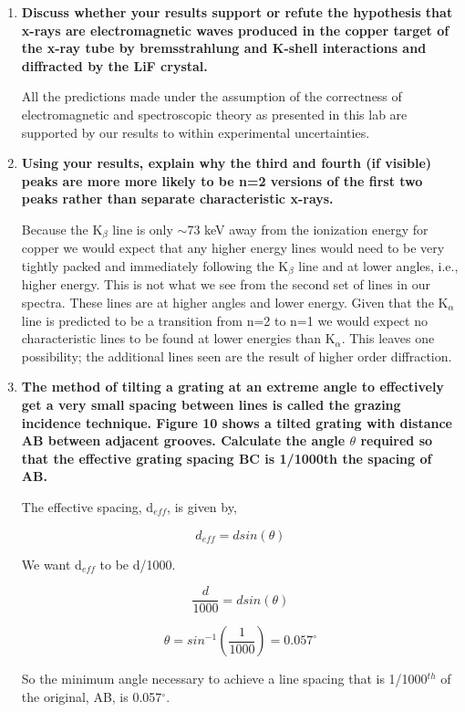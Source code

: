 \begin{enumerate}[resume]
\item {\bf Discuss whether your results support or refute the hypothesis that x-rays are electromagnetic waves produced in the copper target of the x-ray tube by bremsstrahlung and K-shell interactions and diffracted by the LiF crystal.}\newline

All the predictions made under the assumption of the correctness of electromagnetic and spectroscopic theory as presented in this lab are supported by our results to within experimental uncertainties.

\item {\bf Using your results, explain why the third and fourth (if visible) peaks are more more likely to be n=2 versions of the first two peaks rather than separate characteristic x-rays.}\newline

Because the K$_{\beta}$ line is only $\sim$73 keV away from the ionization energy for copper we would expect that any higher energy lines would need to be very tightly packed and immediately following the K$_{\beta}$ line and at lower angles, i.e., higher energy. This is not what we see from the second set of lines in our spectra. These lines are at higher angles and lower energy. Given that the K$_{\alpha}$ line is predicted to be a transition from n=2 to n=1 we would expect no characteristic lines to be found at lower energies than K$_{\alpha}$. This leaves one possibility; the additional lines seen are the result of higher order diffraction.

\item {\bf The method of tilting a grating at an extreme angle to effectively get a very small spacing between lines is called the {\bf grazing incidence technique}. Figure 10 shows a tilted grating with distance AB between adjacent grooves. Calculate the angle $\theta$ required so that the effective grating spacing BC is 1/1000th the spacing of AB.}\newline

The effective spacing, d$_{eff}$, is given by,

\begin{equation}
d_{eff}=dsin(\theta)
\label{equ:twcg5}
\end{equation}

\noindent We want d$_{eff}$ to be d/1000.

\begin{equation}
\dfrac{d}{1000}=dsin(\theta)
\label{equ:twcg6}
\end{equation}

\begin{equation}
\theta=sin^{-1}\left(\dfrac{1}{1000}\right)=0.057^{\circ}
\label{equ:twcg7}
\end{equation}

So the minimum angle necessary to achieve a line spacing that is 1/1000$^{th}$ of the original, AB, is 0.057$^{\circ}$.

\end{enumerate}
\newpage

